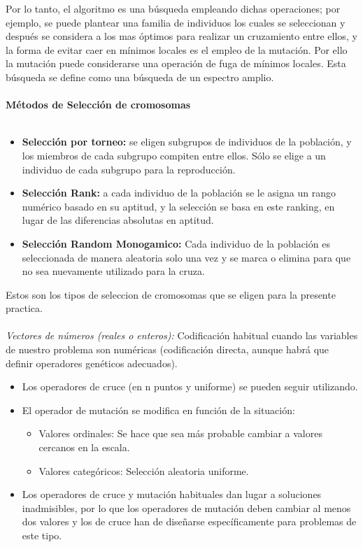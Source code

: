 \documentclass[10pt,letterpaper]{article}
\begin{document}
Por lo tanto, el algoritmo es una búsqueda empleando dichas operaciones; por ejemplo, se puede plantear una familia de individuos los cuales se seleccionan y después se considera a los mas óptimos para realizar un cruzamiento entre ellos, y la forma de evitar caer en mínimos locales es el empleo de la mutación. Por ello la mutación puede considerarse una operación de fuga de mínimos locales. Esta búsqueda se define como una búsqueda de un espectro amplio.
\\\\
\textbf{\large Métodos de Selección de cromosomas}
\\\\
\begin{itemize}
\item \textbf{Selección por torneo:} se eligen subgrupos de individuos de la población, y los miembros de cada subgrupo compiten entre ellos. Sólo se elige a un individuo de cada subgrupo para la reproducción.

\item \textbf{Selección Rank:} a cada individuo de la población se le asigna un rango numérico basado en su aptitud, y la selección se basa en este ranking, en lugar de las diferencias absolutas en aptitud.

\item \textbf{Selección Random Monogamico:} Cada individuo de la población es seleccionada de manera aleatoria solo una vez y se marca o elimina para que no sea nuevamente utilizado para la cruza. 

\end{itemize}

Estos son los tipos de seleccion de cromosomas que se eligen para la presente practica.
\\\\
\textit{Vectores de números (reales o enteros):} Codificación habitual cuando las variables de nuestro problema son numéricas (codificación directa, aunque habrá que definir operadores genéticos adecuados).

\begin{itemize}
\item Los operadores de cruce (en n puntos y uniforme) se pueden seguir utilizando.

\item El operador de mutación se modifica en función de la
situación:

\begin{itemize}
\item Valores ordinales: Se hace que sea más probable
cambiar a valores cercanos en la escala.

\item Valores categóricos: Selección aleatoria uniforme.	
\end{itemize}

\item Los operadores de cruce y mutación habituales dan lugar a soluciones inadmisibles, por lo que los operadores de mutación deben cambiar al menos dos
valores y los de cruce han de diseñarse específicamente para problemas de este tipo.

\end{itemize}
\end{document}
